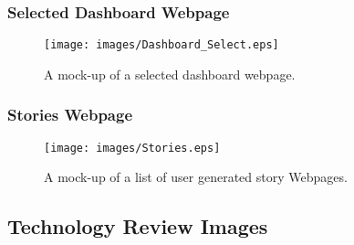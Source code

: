 \subsubsection{Selected Dashboard Webpage}
\label{sec:selected_dashboards}
\begin{figure}[H]
    \centering
    \texttt{[image: images/Dashboard\_Select.eps]}
    \caption{A mock-up of a selected dashboard webpage.}
\end{figure}

\subsubsection{Stories Webpage}
\label{sec:story}
\begin{figure}[H]
    \centering
    \texttt{[image: images/Stories.eps]}
    \caption{A mock-up of a list of user generated story Webpages.}
\end{figure}

\subsection{Technology Review Images}
